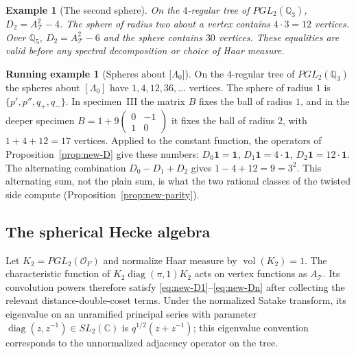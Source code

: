 \documentclass[12pt,letterpaper]{amsart}
\numberwithin{equation}{section}
\newtheorem{example}[theorem]{Example}
\theoremstyle{definition}
\newtheorem{runex}[theorem]{Running example}
\theoremstyle{plain}
\newcommand{\smat}[4]{\left(\begin{smallmatrix}#1&#2\\#3&#4\end{smallmatrix}\right)}
\begin{document}
\begin{example}[The second sphere]
On the $4$-regular tree of $PGL_2(\mathbb Q_3)$,
$D_2=A_{\mathcal T}^2-4$. The sphere of radius two about
a vertex contains $4\cdot3=12$ vertices. Over $\mathbb Q_5$,
$D_2=A_{\mathcal T}^2-6$ and the sphere contains $30$
vertices. These equalities are valid before any spectral
decomposition or choice of Haar measure.
\end{example}

\begin{runex}[Spheres about $\lbrack\Lambda_0\rbrack$]
\label{run:hecke}
On the $4$-regular tree of $PGL_2(\mathbb Q_3)$ the spheres about
$[\Lambda_0]$ have $1,4,12,36,\dots$ vertices. The sphere of radius
$1$ is $\{p',p'',q_+,q_-\}$. In specimen~III the matrix $B$ fixes the
ball of radius $1$, and in the deeper specimen
$B=1+9\smat{0}{-1}{1}{0}$ it fixes the ball of radius $2$, with
$1+4+12=17$ vertices. Applied to the constant function, the operators
of Proposition~\ref{prop:new-D} give these numbers:
$D_0\mathbf 1=\mathbf 1$, $D_1\mathbf 1=4\cdot\mathbf 1$,
$D_2\mathbf 1=12\cdot\mathbf 1$. The alternating combination
$D_0-D_1+D_2$ gives $1-4+12=9=3^2$. This alternating sum, not the
plain sum, is what the two rational classes of the twisted side
compute (Proposition~\ref{prop:new-parity}).
\end{runex}

\subsection{The spherical Hecke algebra}
Let $K_2=PGL_2(\mathcal O_F)$ and normalize Haar measure by
$\operatorname{vol}(K_2)=1$. The characteristic function of
$K_2\operatorname{diag}(\pi,1)K_2$ acts on vertex functions
as $A_{\mathcal T}$. Its convolution powers therefore satisfy
\eqref{eq:new-D1}--\eqref{eq:new-Dn} after collecting the
relevant distance-double-coset terms. Under the normalized
Satake transform, its eigenvalue on an unramified principal series
with parameter $\operatorname{diag}(z,z^{-1})\in SL_2(\mathbb C)$
is $q^{1/2}(z+z^{-1})$; this eigenvalue convention corresponds to
the unnormalized adjacency operator on the tree.
\end{document}
